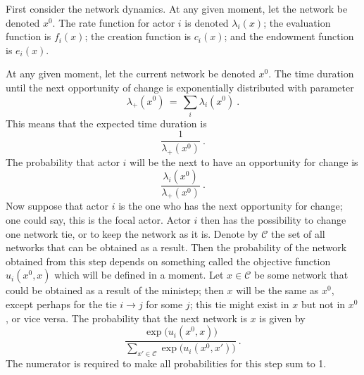 \documentclass[a4paper,fleqn,11pt]{article}
\newcommand{\+}{\, + \,}
\begin{document}
First consider the network dynamics.
At any given moment, let the network be denoted $x^0$.
The rate function for actor $i$ is denoted $\lambda_i(x)$;
the evaluation function is $f_i(x)$; the creation function is $c_i(x)$;
and the endowment function is $e_i(x)$.

At any given moment, let the current network be denoted $x^0$.
The time duration until the next opportunity of change
is exponentially distributed with parameter
\[
  \lambda_+(x^0) \,=\, \sum_i \lambda_i(x^0) \ .
\]
This means that the expected time duration is
\[
   \frac{1}{\lambda_+(x^0)} \ .
\]
The probability that actor $i$ will be the next to
have an opportunity for change is
\[
  \frac{\lambda_i(x^0)}{\lambda_+(x^0)} \ .
\]
Now suppose that actor $i$ is the one who has the next opportunity
for change; one could say, this is the focal actor.
Actor $i$ then has the possibility to change one network tie,
or to keep the network as it is.
Denote by $\mathcal C$ the set of all networks that can be obtained
as a result.
Then the probability of the network obtained from this step depends on
something called the objective function $u_i(x^0, x)$ which will be defined
in a moment.
Let $x \in \mathcal C$ be some network that could be obtained as a result
of the ministep; then $x$ will be the same as $x^0$, except perhaps for
the tie $i \rightarrow j$ for some $j$; this tie might exist in $x$ but not in
$x^0$, or vice versa.
The probability that the next network is $x$ is given by
\begin{equation}
     \frac{\exp(u_i(x^0, x)\big)}
          {\sum_{x' \in \mathcal C} \exp\big(u_i(x^0, x')\big)} \ . \label{probab}
\end{equation}
The numerator is required to make all probabilities for this step sum to 1.
\end{document}
